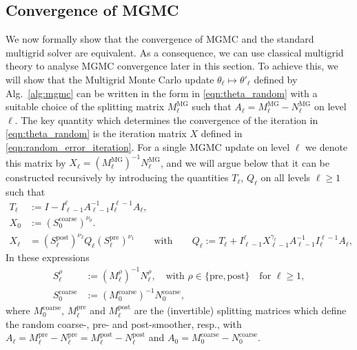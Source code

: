 \documentclass[11pt,english]{article}
\theoremstyle{plain}
\theoremstyle{plain}
\theoremstyle{plain}
\theoremstyle{plain}
\numberwithin{equation}{section}
\newcommand*{\id}{I}
\begin{document}
\subsection{Convergence of MGMC}\label{sec:theory_convergence}
We now formally show that the convergence of MGMC and the standard multigrid solver are equivalent. As a consequence, we can use classical multigrid theory to analyse MGMC convergence later in this section. To achieve this, we will show that the Multigrid Monte Carlo update $\theta_\ell \mapsto \theta'_\ell$ defined by Alg.~\ref{alg:mgmc} can be written in the form in \eqref{eqn:theta_random} with a suitable choice of the splitting matrix $M^{\mathrm{MG}}_\ell$ such that $A_\ell=M^{\mathrm{MG}}_\ell-N^{\mathrm{MG}}_\ell$ on level $\ell$.
The key quantity which determines the convergence of the iteration in \eqref{eqn:theta_random} is the iteration matrix $X$ defined in \eqref{eqn:random_error_iteration}. For a single MGMC update on level $\ell$ we denote this matrix by $X_\ell=(M_\ell^{\mathrm{MG}})^{-1} N_\ell^{\mathrm{MG}}$, and we will argue below that it can be constructed recursively by introducing the quantities $T_{\ell}$, $Q_{\ell}$ on all levels $\ell\ge 1$ such that
\begin{subequations}
	\begin{align}
		T_{\ell} & :=\id-I_{\ell-1}^{\ell}A_{\ell-1}^{-1}I_{\ell}^{\ell-1}A_{\ell},\label{eq:def-Tell}                                                                                                                                                   \\
		X_0      & := (S_0^{\mathrm{coarse}})^{\nu_0}.\label{eq:def-X0}\\
		X_{\ell} & =(S_{\ell}^{\mathrm{post}})^{\nu_{2}}Q_{\ell}(S_{\ell}^{\mathrm{pre}})^{\nu_{1}}\qquad\text{with}\qquad Q_{\ell}:=T_{\ell}+I_{\ell-1}^{\ell}X_{\ell-1}^{\gamma_{\ell}}A_{\ell-1}^{-1}I_{\ell}^{\ell-1}A_{\ell},\label{eq:def-Xell-Qell}
	\end{align}
\end{subequations}
In these expressions
\begin{equation}
	\begin{aligned}
		S_\ell^{\rho}         & := (M^{\rho}_{\ell})^{-1}N_{\ell}^{\rho},\quad\text{with $\rho\in\{\text{pre},\text{post}\}$}\quad\text{for $\ell\ge 1$}, \\
		S_0^{\mathrm{coarse}} & := (M^{\mathrm{coarse}}_0)^{-1}N_0^{\mathrm{coarse}},
	\end{aligned}\label{eqn:S_matrices}
\end{equation}
where $M^{\mathrm{coarse}}_{0}$, $M^{\mathrm{pre}}_{\ell}$ and $M^{\mathrm{post}}_{\ell}$ are the (invertible) splitting matrices which define the random coarse-, pre- and post-smoother, resp., with $A_{\ell}=M^{\mathrm{pre}}_{\ell}-N^{\mathrm{pre}}_{\ell}=M^{\mathrm{post}}_{\ell}-N^{\mathrm{post}}_{\ell}$ and $A_{0}=M^{\mathrm{coarse}}_{0}-N^{\mathrm{coarse}}_{0}$.
\end{document}
